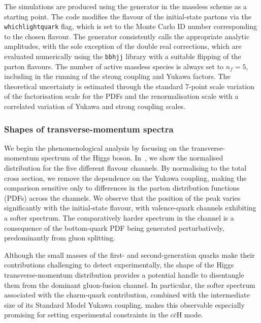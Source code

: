 \documentclass[11pt,a4paper]{article}
\begin{document}
The simulations are produced using the \minnlo{} \bbH{} generator in the massless scheme as a starting point. The code modifies the flavour of the initial-state partons via the \texttt{whichlightquark} flag, which is set to the Monte Carlo ID number corresponding to the chosen flavour. The generator consistently calls the appropriate analytic amplitudes, with the sole exception of the double real corrections, which are evaluated numerically using the \OpenLoops{} \texttt{bbhjj} library with a suitable flipping of the parton flavours. The number of active massless species is always set to \( n_f = 5 \), including in the running of the strong coupling and Yukawa factors. The theoretical uncertainty is estimated through the standard 7-point scale variation of the factorisation scale for the PDFs and the renormalisation scale with a correlated variation of Yukawa and strong coupling scales.

\subsubsection{Shapes of transverse-momentum spectra}
We begin the phenomenological analysis by focusing on the transverse-momentum spectrum of the Higgs boson. In~, we show the normalised distribution for the five different flavour channels. By normalising to the total cross section, we remove the dependence on the Yukawa coupling, making the comparison sensitive only to differences in the parton distribution functions (PDFs) across the channels. We observe that the position of the peak varies significantly with the initial-state flavour, with valence-quark channels exhibiting a softer spectrum. The comparatively harder spectrum in the \bbH{} channel is a consequence of the bottom-quark PDF being generated perturbatively, predominantly from gluon splitting.

Although the small masses of the first- and second-generation quarks make their contributions challenging to detect experimentally, the shape of the Higgs transverse-momentum distribution provides a potential handle to disentangle them from the dominant gluon-fusion channel. In particular, the softer spectrum associated with the charm-quark contribution, combined with the intermediate size of its Standard Model Yukawa coupling, makes this observable especially promising for setting experimental constraints in the $c\bar c \text{H}$ mode.

\end{document}

